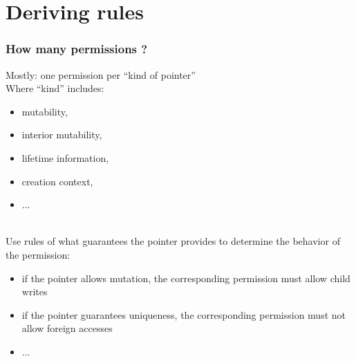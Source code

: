 \section{Deriving rules}

\begin{frame}
    \frametitle{How many permissions ?}
    Mostly: one permission per ``kind of pointer''\\
    Where ``kind'' includes:
    \begin{itemize}
        \item mutability,
        \item interior mutability,
        \item lifetime information,
        \item creation context,
        \item ...
    \end{itemize}~\\

    Use rules of what guarantees the pointer provides
    to determine the behavior of the permission:
    \begin{itemize}
        \item if the pointer allows mutation, the corresponding permission must allow child writes
        \item if the pointer guarantees uniqueness, the corresponding permission must not allow foreign accesses
        \item ...
    \end{itemize}
\end{frame}

